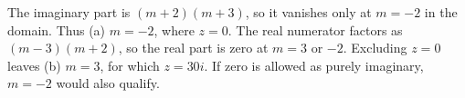 The imaginary part is $(m+2)(m+3)$, so it vanishes only at $m=-2$ in the domain. Thus (a) $m=-2$, where $z=0$. The real numerator factors as $(m-3)(m+2)$, so the real part is zero at $m=3$ or $-2$. Excluding $z=0$ leaves (b) $\boxed{m=3}$, for which $z=30i$. If zero is allowed as purely imaginary, $m=-2$ would also qualify.
